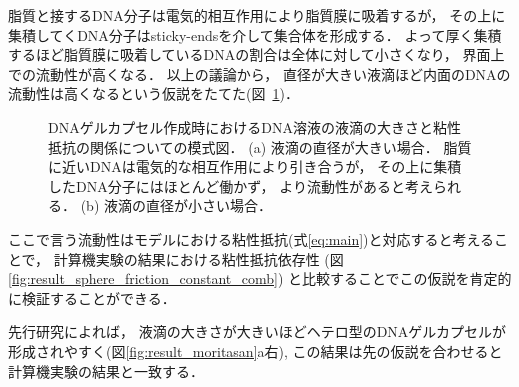 脂質と接するDNA分子は電気的相互作用により脂質膜に吸着するが，
その上に集積してくDNA分子はsticky-endsを介して集合体を形成する．
よって厚く集積するほど脂質膜に吸着しているDNAの割合は全体に対して小さくなり，
界面上での流動性が高くなる．
以上の議論から，
直径が大きい液滴ほど内面のDNAの流動性は高くなるという仮説をたてた(図~\ref{fig:size_and_friction})．
\begin{figure}
    \centering
    
    \caption{
        DNAゲルカプセル作成時におけるDNA溶液の液滴の大きさと粘性抵抗の関係についての模式図．
        (a) 液滴の直径が大きい場合．
            脂質に近いDNAは電気的な相互作用により引き合うが，
            その上に集積したDNA分子にはほとんど働かず，
            より流動性があると考えられる．
        (b) 液滴の直径が小さい場合．
    }
    \label{fig:size_and_friction}
\end{figure}
ここで言う流動性はモデルにおける粘性抵抗(式\ref{eq:main})と対応すると考えることで，
計算機実験の結果における粘性抵抗依存性
(図\ref{fig:result_sphere_friction_constant_comb})
と比較することでこの仮説を肯定的に検証することができる．

先行研究によれば，
液滴の大きさが大きいほどヘテロ型のDNAゲルカプセルが形成されやすく(図\ref{fig:result_moritasan}a右), 
この結果は先の仮説を合わせると計算機実験の結果と一致する．
